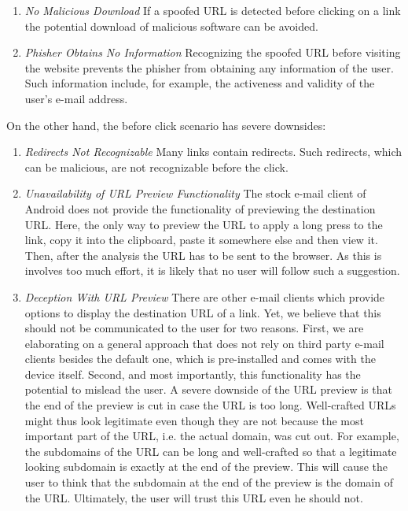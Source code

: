 \begin{description}[leftmargin=0cm]
\begin{enumerate}
	\item \textit{No Malicious Download} If a spoofed URL is detected before clicking on a link the potential download of  malicious software can be avoided. 
	\item \textit{Phisher Obtains No Information} Recognizing the spoofed URL before visiting the website prevents the phisher from obtaining any information of the user. Such information include, for example, the activeness and validity of the user's e-mail address. 
\end{enumerate}

On the other hand, the before click scenario has severe downsides:

\begin{enumerate}
	\item \textit{Redirects Not Recognizable} Many links contain redirects. Such redirects, which can be malicious, are not recognizable before the click.
	\item \textit{Unavailability of URL Preview Functionality} The stock e-mail client of Android does not provide the functionality of previewing the destination URL. 
Here, the only way to preview the URL to apply a long press to the link, copy it into the clipboard, paste it somewhere else and then view it. 
Then, after the analysis the URL has to be sent to the browser.
As this is involves too much effort, it is likely that no user will follow such a suggestion.
	\item \textit{Deception With URL Preview} There are other e-mail clients which provide options to display the destination URL of a link.
Yet, we believe that this should not be communicated to the user for two reasons.
First, we are elaborating on a general approach that does not rely on third party e-mail clients besides the default one, which is pre-installed and comes with the device itself.
Second, and most importantly, this functionality has the potential to mislead the user.
A severe downside of the URL preview is that the end of the preview is cut in case the URL is too long.
 Well-crafted URLs might thus look legitimate even though they are not because the most important part of the URL, i.e. the actual domain, was cut out.
 For example, the subdomains of the URL can be long and well-crafted so that a legitimate looking subdomain is exactly at the end of the preview.
 This will cause the user to think that the subdomain at the end of the preview is the domain of the URL.
 Ultimately, the user will trust this URL even he should not.

\end{enumerate}
\end{description}
